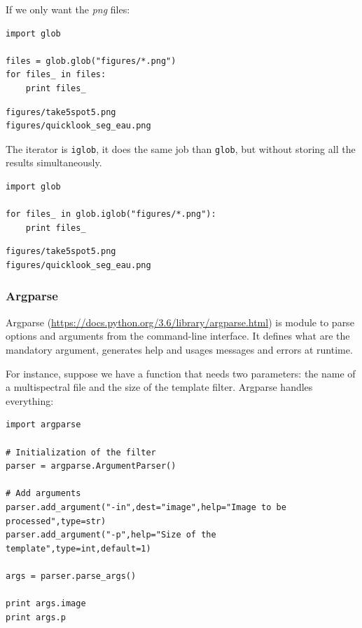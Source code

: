 \documentclass[a4paper,11pt,DIV=18]{scrartcl}
\begin{document}
If we only want the \emph{png} files:

\begin{verbatim}
import glob

files = glob.glob("figures/*.png")
for files_ in files:
    print files_
\end{verbatim}

\begin{verbatim}
figures/take5spot5.png
figures/quicklook_seg_eau.png
\end{verbatim}

The iterator is \texttt{iglob}, it does the same job than \texttt{glob}, but without storing all the results simultaneously.

\begin{verbatim}
import glob

for files_ in glob.iglob("figures/*.png"):
    print files_
\end{verbatim}

\begin{verbatim}
figures/take5spot5.png
figures/quicklook_seg_eau.png
\end{verbatim}

\subsubsection{Argparse}
\label{sec:orgheadline42}
Argparse (\url{https://docs.python.org/3.6/library/argparse.html}) is module
to parse  options and  arguments from  the command-line  interface. It
defines what  are the  mandatory argument,  generates help  and usages
messages and errors at runtime. 

For instance,  suppose we have  a function that needs  two parameters:
the  name  of a  multispectral  file  and  the  size of  the  template
filter. Argparse handles everything:

\begin{verbatim}
import argparse

# Initialization of the filter
parser = argparse.ArgumentParser()

# Add arguments
parser.add_argument("-in",dest="image",help="Image to be processed",type=str)
parser.add_argument("-p",help="Size of the template",type=int,default=1)

args = parser.parse_args()

print args.image
print args.p
\end{verbatim}
\end{document}
